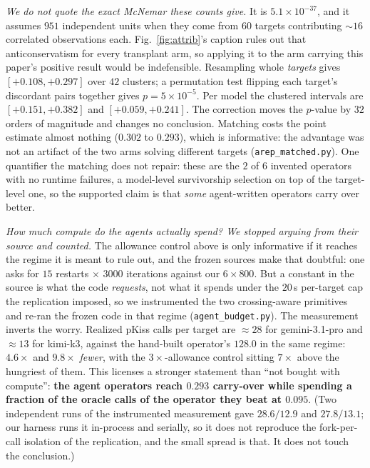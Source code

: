 \documentclass[11pt]{article}
\begin{document}
\emph{We do not quote the exact McNemar these counts give.} It is $5.1\!\times\!10^{-37}$, and it assumes $951$
independent units when they come from $60$ targets contributing ${\sim}16$ correlated observations each.
Fig.~\ref{fig:attrib}'s caption rules out that anticonservatism for every transplant arm, so applying it to the
arm carrying this paper's positive result would be indefensible. Resampling whole \emph{targets} gives
$[{+}0.108,{+}0.297]$ over $42$ clusters; a permutation test flipping each target's discordant pairs together
gives $p{=}5\!\times\!10^{-5}$. Per model the clustered intervals are $[{+}0.151,{+}0.382]$ and
$[{+}0.059,{+}0.241]$. The correction moves the $p$-value by $32$ orders of magnitude and changes no conclusion.
Matching costs the point estimate almost nothing ($0.302$ to $0.293$), which is informative: the
advantage was not an artifact of the two arms solving different targets (\texttt{arep\_matched.py}). One
quantifier the matching does not repair: these are the $2$ of $6$ invented operators with no runtime failures,
a model-level survivorship selection on top of the target-level one, so the supported claim is that
\emph{some} agent-written operators carry over better.

\emph{How much compute do the agents actually spend? We stopped arguing from their source and counted.} The
allowance control above is only informative if it reaches the regime it is meant to rule out, and the frozen
sources make that doubtful: one asks for $15$ restarts $\times$ $3000$ iterations against our $6\times800$.
But a constant in the source is what the code \emph{requests}, not what it spends under the $20$\,s per-target
cap the replication imposed, so we instrumented the two crossing-aware primitives and re-ran the frozen code
in that regime (\texttt{agent\_budget.py}). The measurement inverts the worry. Realized pKiss calls per target
are $\approx\!28$ for gemini-3.1-pro and $\approx\!13$ for kimi-k3, against the hand-built operator's
$\mathbf{128.0}$ in the same regime: $4.6\times$ and $9.8\times$ \emph{fewer}, with the $3\times$-allowance
control sitting $7\times$ above the hungriest of them. This licenses a stronger statement than ``not bought
with compute'': \textbf{the agent operators reach $0.293$ carry-over while spending a fraction of the oracle
calls of the operator they beat at $0.095$}. (Two independent runs of the instrumented measurement gave
$28.6/12.9$ and $27.8/13.1$; our harness runs it in-process and serially, so it does not reproduce the
fork-per-call isolation of the replication, and the small spread is that. It does not touch the conclusion.)
\end{document}
